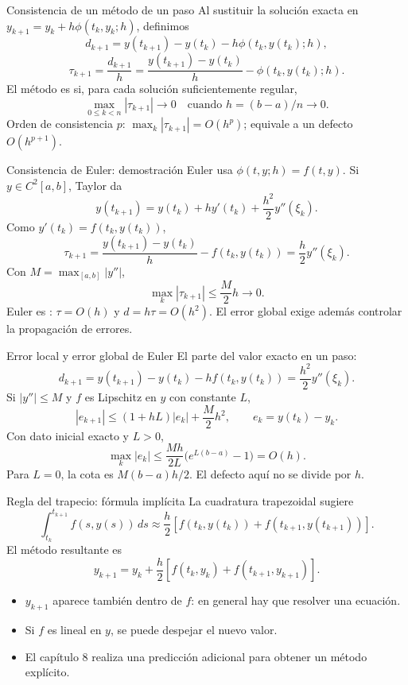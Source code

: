 \documentclass[aspectratio=169,12pt]{beamer}
\begin{document}
\begin{frame}{Consistencia de un método de un paso}
Al sustituir la solución exacta en $y_{k+1}=y_k+h\phi(t_k,y_k;h)$, definimos
\[d_{k+1}=y(t_{k+1})-y(t_k)-h\phi(t_k,y(t_k);h),\]
\[\boxed{\tau_{k+1}=\frac{d_{k+1}}h
=\frac{y(t_{k+1})-y(t_k)}h-\phi(t_k,y(t_k);h).}\]
El método es  si, para cada solución suficientemente regular,
\[\max_{0\leq k<n}|\tau_{k+1}|\longrightarrow0\quad
\text{cuando }h=(b-a)/n\longrightarrow0.\]
Orden de consistencia $p$: $\max_k|\tau_{k+1}|=O(h^p)$;
equivale a un defecto $O(h^{p+1})$.
\end{frame}

\begin{frame}{Consistencia de Euler: demostración}
Euler usa $\phi(t,y;h)=f(t,y)$. Si $y\in C^2[a,b]$, Taylor da
\[y(t_{k+1})=y(t_k)+hy'(t_k)+\frac{h^2}{2}y''(\xi_k).\]
Como $y'(t_k)=f(t_k,y(t_k))$,
\[\tau_{k+1}=\frac{y(t_{k+1})-y(t_k)}h-f(t_k,y(t_k))
=\frac h2y''(\xi_k).\]
Con $M=\max_{[a,b]}|y''|$,
\[\boxed{\max_k|\tau_{k+1}|\leq\frac M2h\longrightarrow0.}\]
Euler es : $\tau=O(h)$ y $d=h\tau=O(h^2)$.
El error global exige además controlar la propagación de errores.
\end{frame}

\begin{frame}{Error local y error global de Euler}
El  parte del valor exacto en un paso:
\[d_{k+1}=y(t_{k+1})-y(t_k)-hf(t_k,y(t_k))
=\frac{h^2}{2}y''(\xi_k).\]
Si $|y''|\leq M$ y $f$ es Lipschitz en $y$ con constante $L$,
\[|e_{k+1}|\leq(1+hL)|e_k|+\frac M2h^2,
\qquad e_k=y(t_k)-y_k.\]
Con dato inicial exacto y $L>0$,
\[\max_k|e_k|\leq\frac{Mh}{2L}\bigl(e^{L(b-a)}-1\bigr)=O(h).\]
\small Para $L=0$, la cota es $M(b-a)h/2$. El defecto aquí no se divide por $h$.
\end{frame}

\begin{frame}{Regla del trapecio: fórmula implícita}
La cuadratura trapezoidal sugiere
\[\int_{t_k}^{t_{k+1}}f(s,y(s))\,ds\approx
\frac h2[f(t_k,y(t_k))+f(t_{k+1},y(t_{k+1}))].\]
El método resultante es
\[\boxed{y_{k+1}=y_k+\frac h2[f(t_k,y_k)+f(t_{k+1},y_{k+1})].}\]
\begin{itemize}
\item $y_{k+1}$ aparece también dentro de $f$: en general hay que resolver una ecuación.
\item Si $f$ es lineal en $y$, se puede despejar el nuevo valor.
\item El capítulo 8 realiza una predicción adicional para obtener un método explícito.
\end{itemize}
\end{frame}
\end{document}
